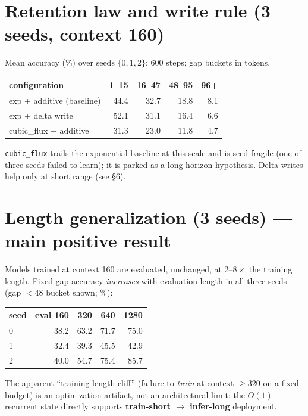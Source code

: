\documentclass[11pt,a4paper]{article}
\newcommand{\code}[1]{\texttt{#1}}
\begin{document}
\section{Retention law and write rule (3 seeds, context 160)}
Mean accuracy (\%) over seeds $\{0,1,2\}$; 600 steps; gap buckets in tokens.

\begin{table}[h]\centering
\begin{tabular}{lrrrr}
\toprule
configuration & 1--15 & 16--47 & 48--95 & 96+ \\
\midrule
exp + additive (baseline) & 44.4 & 32.7 & 18.8 & 8.1 \\
exp + delta write         & 52.1 & 31.1 & 16.4 & 6.6 \\
cubic\_flux + additive    & 31.3 & 23.0 & 11.8 & 4.7 \\
\bottomrule
\end{tabular}
\end{table}

\noindent
\code{cubic\_flux} trails the exponential baseline at this scale and is
seed-fragile (one of three seeds failed to learn); it is parked as a
long-horizon hypothesis. Delta writes help only at short range (see \S6).

\section{Length generalization (3 seeds) --- main positive result}
Models trained at context 160 are evaluated, unchanged, at $2$--$8\times$ the
training length. Fixed-gap accuracy \emph{increases} with evaluation length in
all three seeds (gap $<$48 bucket shown; \%):

\begin{table}[h]\centering
\begin{tabular}{lrrrr}
\toprule
seed & eval 160 & 320 & 640 & 1280 \\
\midrule
0 & 38.2 & 63.2 & 71.7 & 75.0 \\
1 & 32.4 & 39.3 & 45.5 & 42.9 \\
2 & 40.0 & 54.7 & 75.4 & 85.7 \\
\bottomrule
\end{tabular}
\end{table}

\noindent
The apparent ``training-length cliff'' (failure to \emph{train} at context
$\ge$320 on a fixed budget) is an optimization artifact, not an architectural
limit: the $O(1)$ recurrent state directly supports
\textbf{train-short $\rightarrow$ infer-long} deployment.
\end{document}
